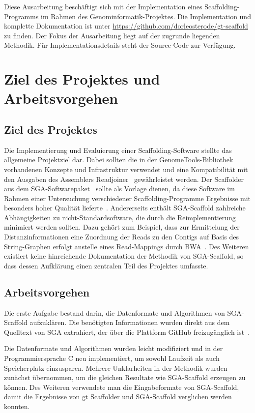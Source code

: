 \documentclass[a4paper,10pt,parskip]{scrartcl}
\begin{document}
Diese Ausarbeitung beschäftigt sich mit der Implementation eines
Scaffolding-Programms im Rahmen des Genominformatik-Projektes. Die
Implementation und komplette Dokumentation ist unter
\url{https://github.com/dorleosterode/gt-scaffold} zu finden. Der Fokus der
Ausarbeitung liegt auf der zugrunde liegenden Methodik. Für
Implementationsdetails steht der Source-Code zur Verfügung.

\section{Ziel des Projektes und Arbeitsvorgehen}
\subsection{Ziel des Projektes}
Die Implementierung und Evaluierung einer Scaffolding-Software stellte
das allgemeine Projektziel dar. Dabei sollten die in der
GenomeTools-Bibliothek~\cite{Gremme:2013} vorhandenen Konzepte und
Infrastruktur verwendet und eine Kompatibilität mit den Ausgaben des
Assemblers Readjoiner~\cite{Gonnella:2012gn} gewährleistet werden. Der
Scaffolder aus dem SGA-Softwarepaket~\cite{Simpson:2012ef} sollte als
Vorlage dienen, da diese Software im Rahmen einer Untersuchung
verschiedener Scaffolding-Programme Ergebnisse mit besonders hoher
Qualität lieferte~\cite{Hunt:2014dh}. Andererseits enthält
SGA-Scaffold zahlreiche Abhängigkeiten zu nicht-Standardsoftware, die
durch die Reimplementierung minimiert werden sollten. Dazu gehört zum
Beispiel, dass zur Ermittelung der Distanzinformationen eine Zuordnung
der Reads zu den Contigs auf Basis des String-Graphen erfolgt anstelle
eines Read-Mappings durch BWA~\cite{Li:2009}. Des Weiteren existiert
keine hinreichende Dokumentation der Methodik von SGA-Scaffold, so
dass dessen Aufklärung einen zentralen Teil des Projektes umfasste.

\subsection{Arbeitsvorgehen}
Die erste Aufgabe bestand darin, die Datenformate und Algorithmen
von SGA-Scaffold aufzuklären. Die benötigten Informationen
wurden direkt aus dem Quelltext von SGA extrahiert, der über die
Plattform GitHub freizugänglich ist~\cite{source}.

Die Datenformate und Algorithmen wurden leicht modifiziert und in
der Programmiersprache C neu implementiert, um sowohl Laufzeit
als auch Speicherplatz einzusparen. Mehrere Unklarheiten in der
Methodik wurden zunächst übernommen, um die gleichen Resultate wie
SGA-Scaffold erzeugen zu können. Des Weiteren verwendete man die
Eingabeformate von SGA-Scaffold, damit die Ergebnisse von gt Scaffolder
und SGA-Scaffold verglichen werden konnten.
\end{document}
